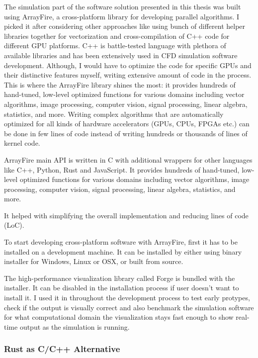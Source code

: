 The simulation part of the software solution presented in this thesis was built using ArrayFire, a cross-platform library for developing parallel algorithms. I picked it after considering other approaches like using bunch of different helper libraries together for vectorization and cross-compilation of C++ code for different GPU platforms. C++ is battle-tested language with plethora of available libraries and has been extensively used in CFD simulation software development. Although, I would have to optimize the code for specific GPUs and their distinctive features myself, writing extensive amount of code in the process. This is where the ArrayFire library shines the most: it provides hundreds of hand-tuned, low-level optimized functions for various domains including vector algorithms, image processing, computer vision, signal processing, linear algebra, statistics, and more. Writing complex algorithms that are automatically optimized for all kinds of hardware accelerators (GPUs, CPUs, FPGAs etc.) can be done in few lines of code instead of writing hundreds or thousands of lines of kernel code.

ArrayFire main API is written in C with additional wrappers for other languages like C++, Python, Rust and JavaScript. It provides hundreds of hand-tuned, low-level optimized functions for various domains including vector algorithms, image processing, computer vision, signal processing, linear algebra, statistics, and more.

It helped with simplifying the overall implementation and reducing lines of code (LoC).

To start developing cross-platform software with ArrayFire, first it has to be installed on a development machine. It can be installed by either using binary installer for Windows, Linux or OSX, or built from source.

The high-performance visualization library called Forge is bundled with the installer. It can be disabled in the installation process if user doesn't want to install it. I used it in throughout the development process to test early protypes, check if the output is visually correct and also benchmark the simulation software for what computational domain the visualization stays fast enough to show real-time output as the simulation is running.



\subsubsection{Rust as C/C++ Alternative} \label{sec:rust-alt}

